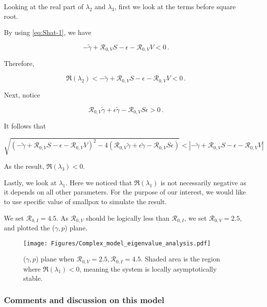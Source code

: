 \documentclass[12pt]{article}
\newcommand{\R}{\mathcal{R}}
\begin{document}
Looking at the real part of $\lambda_2$ and $\lambda_3$, first we look at the terms before square root. 

By using \autoref{eq:Shat-1}, we have
\begin{linenomath*}
\begin{equation}
-\tilde{\gamma}+\R_{0,V}S-\epsilon-\R_{0,V}V<0\,.
\end{equation}
\end{linenomath*}

Therefore,
\begin{linenomath*}
\begin{equation}
\Re(\lambda_2)<-\tilde{\gamma}+\R_{0,V}S-\epsilon-\R_{0,V}V<0\,.
\end{equation}
\end{linenomath*}

Next, notice
\begin{linenomath*}
\begin{equation}
\R_{0,V}\tilde{\gamma}+\epsilon\tilde{\gamma}-\R_{0,V}S\epsilon>0\,.
\end{equation}
\end{linenomath*}
It follows that
\begin{linenomath*}
\begin{equation}
\sqrt{(-\tilde{\gamma}+\R_{0,V} S-\epsilon-\R_{0,V}V)^2-4(\R_{0,V}\tilde{\gamma}+\epsilon\tilde{\gamma}-\R_{0,V}S\epsilon)}<|-\tilde{\gamma}+\R_{0,V} S-\epsilon-\R_{0,V}V|
\end{equation}
\end{linenomath*}
As the result, $\Re(\lambda_3)<0$.

Lastly, we look at $\lambda_1$. Here we noticed that $\Re(\lambda_1)$ is not necessarily negative as it depends on all other parameters. For the purpose of our interest, we would like to use specific value of smallpox to simulate the result.

We set $\R_{0,I}=4.5$. As $\R_{0,V}$ should be logically less than $\R_{0,I}$, we set $\R_{0,V}=2.5$, and plotted the ($\gamma,p$) plane.

\begin{figure}[H]
  \centering
  \texttt{[image: Figures/Complex\_model\_eigenvalue\_analysis.pdf]}
  \caption{($\gamma,p$) plane when $\R_{0,V}=2.5, \R_{0,I}=4.5$. Shaded area is the region where $\Re(\lambda_1)<0$, meaning the system is locally asymptotically stable.}
\end{figure}

\subsubsection{Comments and discussion on this model}
\end{document}
